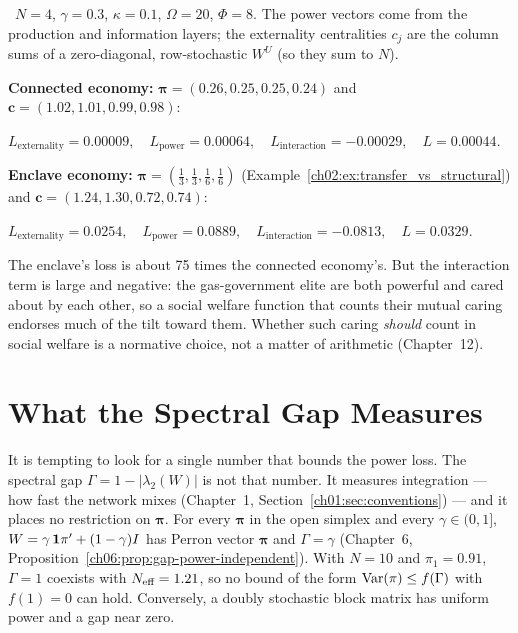 \documentclass[../structural_economics_book.tex]{subfiles}
\begin{document}
\begin{example}\label{ch02:ex:decomposition}
\illustrative\ $N = 4$, $\gamma = 0.3$, $\kappa = 0.1$, $\Omega = 20$, $\Phi = 8$. The power vectors come from the production and information layers; the externality centralities $c_j$ are the column sums of a zero-diagonal, row-stochastic $W^U$ (so they sum to $N$).

\textbf{Connected economy:} $\boldsymbol{\pi} = (0.26, 0.25, 0.25, 0.24)$ and $\mathbf{c} = (1.02, 1.01, 0.99, 0.98)$:
\begin{center}
$L_{\text{externality}} = 0.00009, \quad L_{\text{power}} = 0.00064, \quad L_{\text{interaction}} = -0.00029, \quad L = 0.00044.$
\end{center}

\textbf{Enclave economy:} $\boldsymbol{\pi} = (\frac13, \frac13, \frac16, \frac16)$ (Example~\ref{ch02:ex:transfer_vs_structural}) and $\mathbf{c} = (1.24, 1.30, 0.72, 0.74)$:
\begin{center}
$L_{\text{externality}} = 0.0254, \quad L_{\text{power}} = 0.0889, \quad L_{\text{interaction}} = -0.0813, \quad L = 0.0329.$
\end{center}

The enclave's loss is about 75 times the connected economy's. But the interaction term is large and negative: the gas-government elite are both powerful and cared about by each other, so a social welfare function that counts their mutual caring endorses much of the tilt toward them. Whether such caring \textit{should} count in social welfare is a normative choice, not a matter of arithmetic (Chapter~12).
\end{example}


\section{What the Spectral Gap Measures}
\label{ch02:sec:gap}

It is tempting to look for a single number that bounds the power loss. The spectral gap $\Gamma = 1 - |\lambda_2(W)|$ is not that number. It measures integration --- how fast the network mixes (Chapter~1, Section~\ref{ch01:sec:conventions}) --- and it places no restriction on $\boldsymbol{\pi}$. For every $\boldsymbol{\pi}$ in the open simplex and every $\gamma \in (0, 1]$, $W = \gamma\,\mathbf{1}\pi' + (1-\gamma)I$ has Perron vector $\boldsymbol{\pi}$ and $\Gamma = \gamma$ (Chapter~6, Proposition~\ref{ch06:prop:gap-power-independent}). With $N = 10$ and $\pi_1 = 0.91$, $\Gamma = 1$ coexists with $N_{\text{eff}} = 1.21$, so no bound of the form $\operatorname{Var}(\pi) \le f(\Gamma)$ with $f(1) = 0$ can hold. Conversely, a doubly stochastic block matrix has uniform power and a gap near zero.
\end{document}
